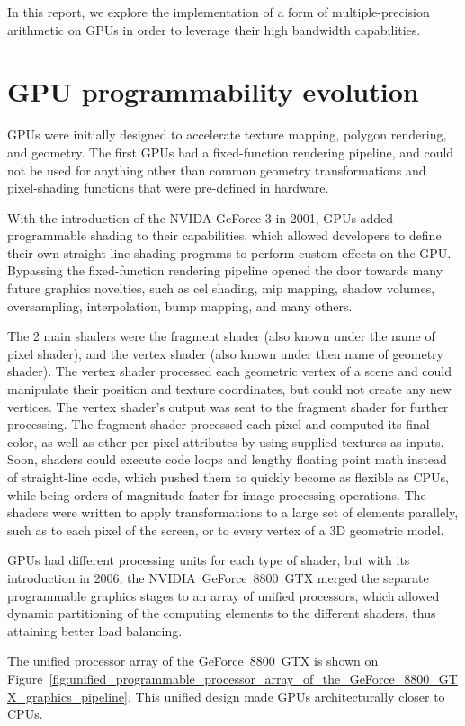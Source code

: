 \documentclass[10pt, a4paper]{report}
\begin{document}
In this report, we explore the implementation of a form of multiple-precision
arithmetic on GPUs in order to leverage their high bandwidth capabilities.

\section{GPU programmability evolution}
GPUs were initially designed to accelerate texture mapping, polygon rendering,
and geometry.
The first GPUs had a fixed-function rendering pipeline, and could not be used
for anything other than common geometry transformations and pixel-shading
functions that were pre-defined in hardware.

With the introduction of the NVIDA GeForce 3 in 2001, GPUs added programmable
shading to their capabilities, which allowed developers to define their own
straight-line shading programs to perform custom effects on the GPU.
Bypassing the fixed-function rendering pipeline opened the door towards many
future graphics novelties, such as cel shading, mip mapping, shadow volumes,
oversampling, interpolation, bump mapping, and many others.

The 2 main shaders were the fragment shader (also known under the name of pixel
shader), and the vertex shader (also known under then name of geometry shader).
The vertex shader processed each geometric vertex of a scene and could
manipulate their position and texture coordinates, but could not create any new
vertices.
The vertex shader's output was sent to the fragment shader for further
processing.
The fragment shader processed each pixel and computed its final color, as well
as other per-pixel attributes by using supplied textures as inputs.
Soon, shaders could execute code loops and lengthy floating point math instead
of straight-line code, which pushed them to quickly become as flexible as CPUs,
while being orders of magnitude faster for image processing operations.
The shaders were written to apply transformations to a large set of elements
parallely, such as to each pixel of the screen, or to every vertex of a 3D
geometric model.

GPUs had different processing units for each type of shader, but with its
introduction in 2006, the NVIDIA~GeForce~8800~GTX merged the separate
programmable graphics stages to an array of unified processors, which allowed
dynamic partitioning of the computing elements to the different shaders, thus
attaining better load balancing.

The unified processor array of the GeForce~8800~GTX is shown on
Figure~\ref{fig:unified_programmable_processor_array_of_the_GeForce_8800_GTX_graphics_pipeline}.
This unified design made GPUs architecturally closer to CPUs.
\end{document}
